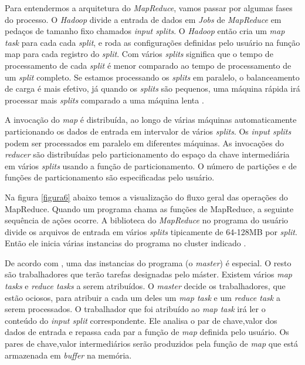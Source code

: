                 Para entendermos a arquitetura do \textit{MapReduce}, vamos passar por algumas fases do processo.
                O \textit{Hadoop} divide a entrada de dados em \textit{Jobs} de \textit{MapReduce} em pedaços de
                tamanho fixo chamados \textit{input splits}. O \textit{Hadoop} então cria um \textit{map task} para
                cada cada \textit{split}, e roda as configurações definidas pelo usuário na função map para cada registro
                do \textit{split}. Com vários \textit{splits} significa que o tempo de processamento de cada \textit{split}
                é menor comparado ao tempo de processamento de um \textit{split} completo. Se estamos processando
                os \textit{splits} em paralelo, o balanceamento de carga é mais efetivo, já quando os \textit{splits} são
                pequenos, uma máquina rápida irá processar mais \textit{splits} comparado a uma máquina lenta
                \cite{white2015}.

                A invocação do \textit{map} é distribuída, ao longo de várias máquinas automaticamente particionando
                os dados de entrada em intervalor de vários \textit{splits}. Os \textit{input splits} podem ser processados
                em paralelo em diferentes máquinas. As invocações do \textit{reducer} são distribuídas pelo particionamento
                do espaço da chave intermediária em vários \textit{splits} usando a função de particionamento. O número
                de partições e de funções de particionamento são especificadas pelo usuário.

                Na figura \ref{figura6} abaixo temos a visualização do fluxo geral das operações do MapReduce. Quando
                um programa chama as funções de MapReduce, a seguinte sequência de ações ocorre. A biblioteca do
                \textit{MapReduce} no programa do usuário divide os arquivos de entrada em vários \textit{splits} tipicamente
                de 64-128MB por \textit{split}. Então ele inicia várias instancias do programa no cluster indicado \cite{dean2008}.

                De acordo com , uma das instancias do programa (o \textit{master}) é especial. O resto
                são trabalhadores que terão tarefas designadas pelo máster. Existem vários \textit{map tasks} e
                \textit{reduce tasks} a serem atribuídos. O \textit{master} decide os trabalhadores, que estão ociosos, para
                atribuir a cada um deles um \textit{map task} e um \textit{reduce task} a serem processados. O trabalhador
                que foi atribuído ao \textit{map task} irá ler o conteúdo do \textit{input split} correspondente. Ele analisa o
                par de {chave,valor} dos dados de entrada e repassa cada par a função de \textit{map} definida pelo usuário.
                Os pares de {chave,valor} intermediários serão produzidos pela função de \textit{map} que está armazenada
                em \textit{buffer} na memória.

